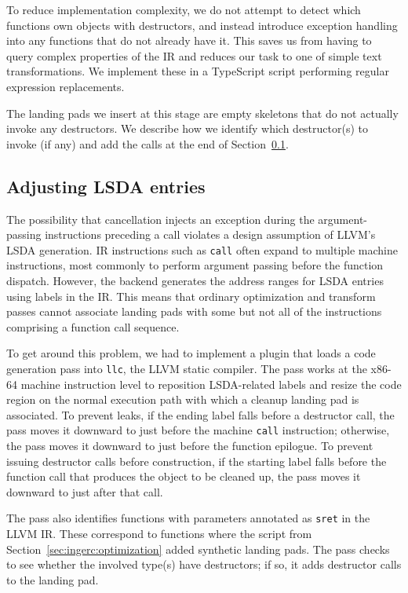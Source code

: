 To reduce implementation complexity, we do not attempt to detect which functions own
objects with destructors, and instead introduce exception handling into any functions
that do not already have it.  This saves us from having to query complex properties
of the IR and reduces our task to one of simple text transformations.  We implement
these in a TypeScript script performing regular expression replacements.

The landing pads we insert at this stage are empty skeletons that do not actually
invoke any destructors.  We describe how we identify which destructor(s) to invoke
(if any) and add the calls at the end of Section~\ref{sec:ingerc:codegen}.


\subsection{Adjusting LSDA entries}
\label{sec:ingerc:codegen}

The possibility that cancellation injects an exception during the argument-passing
instructions
preceding a call violates a design assumption of LLVM's LSDA generation.  IR
instructions such as \texttt{call} often expand to multiple machine instructions,
most commonly to perform argument passing before the function dispatch.  However, the
backend generates the address ranges for LSDA entries using labels in the IR.  This
means that ordinary optimization and transform passes cannot associate landing pads
with some but not all of the instructions comprising a function call sequence.

To get around this problem, we had to implement a plugin that loads a code generation
pass into \texttt{llc}, the LLVM static compiler.  The pass works at the x86-64
machine instruction level to reposition LSDA-related labels and resize the code
region
on the normal execution path with which a cleanup landing pad is associated.  To
prevent leaks, if the ending label falls before a destructor call, the pass moves it
downward
to just before the machine \texttt{call} instruction; otherwise, the pass moves it
downward
to just before the function epilogue.  To prevent issuing destructor calls before
construction, if the starting label falls before the function call that produces the
object to be cleaned up, the pass moves it downward to just after that call.

The pass also identifies functions with parameters annotated as
\texttt{sret} in the LLVM IR.  These correspond to functions where the script from
Section~\ref{sec:ingerc:optimization} added synthetic landing pads.  The pass checks
to see
whether the involved type(s) have destructors; if so, it adds destructor calls to the
landing pad.


